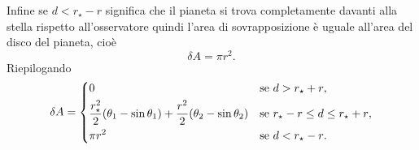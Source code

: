Infine se $d < r_\star - r$ significa che il pianeta si trova completamente
davanti alla stella rispetto all'osservatore quindi l'area di sovrapposizione è
uguale all'area del disco del pianeta, cioè
\begin{equation}
  \delta A = \pi r^2.
\end{equation}
Riepilogando
\begin{equation}
  \delta A =
  \begin{dcases}
    0 & \text{se $d > r_\star + r$}, \\
    \frac{r_\star^2}{2}(\theta_1 - \sin\theta_1) + \frac{r^2}{2}(\theta_2 -
    \sin\theta_2) & \text{se $r_\star - r \leq d \leq r_\star + r$}, \\
    \pi r^2 & \text{se $d < r_\star - r$}.
  \end{dcases}
\end{equation}


